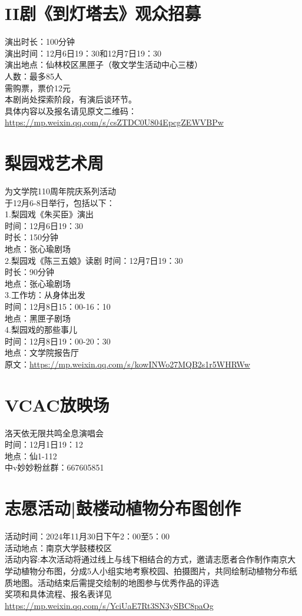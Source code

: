 \documentclass[letterpaper, 12pt]{article}
\begin{document}
\begin{multicols}{2}
\section{II剧《到灯塔去》观众招募}
演出时长：100分钟\\
演出时间：12月6日19：30和12月7日19：30\\
演出地点：仙林校区黑匣子（敬文学生活动中心三楼）\\
人数：最多85人\\
需购票，票价12元\\
本剧尚处探索阶段，有演后谈环节。\\
具体内容以及报名请见原文二维码：\url{https://mp.weixin.qq.com/s/csZTDC0U804EpcgZEWVBPw}

\section{梨园戏艺术周}
为文学院110周年院庆系列活动\\
于12月6-8日举行，包括以下：\\
1.梨园戏《朱买臣》演出\\
时间：12月6日19：30\\
时长：150分钟\\
地点：张心瑜剧场\\
2.梨园戏《陈三五娘》读剧
时间：12月7日19：30\\
时长：90分钟\\
地点：张心瑜剧场\\
3.工作坊：从身体出发\\
时间：12月8日15：00-16：10\\
地点：黑匣子剧场\\
4.梨园戏的那些事儿\\
时间：12月8日19：00-20：30\\
地点：文学院报告厅\\
原文：\url{https://mp.weixin.qq.com/s/kowINWo27MQB2s1r5WHRWw}


\section{VCAC放映场}
洛天依无限共鸣全息演唱会\\
时间：12月1日19：12\\
地点：仙1-112\\
中v妙妙粉丝群：667605851

\section{志愿活动|鼓楼动植物分布图创作}
活动时间：2024年11月30日下午2：00至5：00\\
活动地点：南京大学鼓楼校区\\
活动内容:本次活动将通过线上与线下相结合的方式，邀请志愿者合作制作南京大学动植物分布图，分成5人小组实地考察校园、拍摄图片，共同绘制动植物分布纸质地图。活动结束后需提交绘制的地图参与优秀作品的评选\\
奖项和具体流程、报名表详见
\url{https://mp.weixin.qq.com/s/YciUaE7Rt3SN3ySBC8paOg}


\end{multicols}
\end{document}
